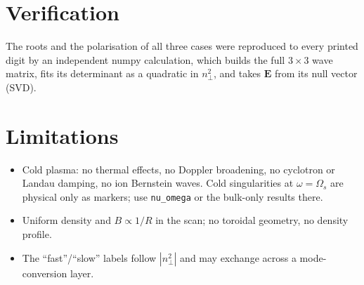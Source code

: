 \documentclass[11pt,a4paper]{article}
\newcommand{\nperp}{n_\perp}
\newcommand{\code}[1]{\texttt{#1}}
\begin{document}
\section{Verification}

The roots and the polarisation of all three cases were reproduced to every
printed digit by an independent numpy calculation, which builds the full
$3\times3$ wave matrix, fits its determinant as a quadratic in $\nperp^2$, and
takes $\mathbf{E}$ from its null vector (SVD).

\section{Limitations}

\begin{itemize}[nosep]
  \item Cold plasma: no thermal effects, no Doppler broadening, no cyclotron
        or Landau damping, no ion Bernstein waves. Cold singularities at
        $\omega=\Omega_s$ are physical only as markers; use \code{nu\_omega}
        or the bulk-only results there.
  \item Uniform density and $B\propto1/R$ in the scan; no toroidal
        geometry, no density profile.
  \item The ``fast''/``slow'' labels follow $|\nperp^2|$ and may exchange
        across a mode-conversion layer.
\end{itemize}
\end{document}
